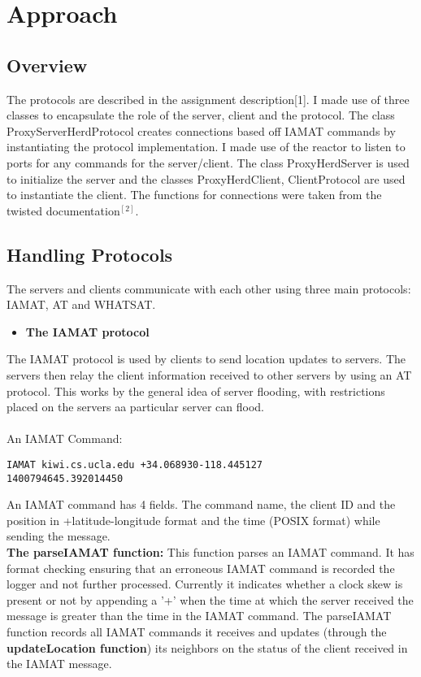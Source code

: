 \documentclass[letterpaper,twocolumn,10pt]{article}
\begin{document}
\section{Approach}
\label{ApproachSection}

\subsection{Overview} 
The protocols are described in the assignment description[1]. I made use of three classes to encapsulate the role of the server, client  and the protocol. The class ProxyServerHerdProtocol creates connections based off IAMAT commands by instantiating the protocol implementation. I made use of the reactor to listen to ports for any commands for the server/client. The class ProxyHerdServer is used to initialize the server and the classes ProxyHerdClient, ClientProtocol are used to instantiate the client. The functions for connections were taken from the twisted documentation$^{[2]}$.


\subsection{Handling Protocols} 
The servers and clients communicate with each other using three main protocols: IAMAT, AT and WHATSAT.

\begin{itemize}
\item \textbf{The IAMAT protocol}
\end{itemize}


The IAMAT protocol is used by clients to send location updates to servers. The servers then relay the client information received to other servers by using an AT protocol. This works by the general idea of server flooding, with restrictions placed on the servers aa particular server can flood.\\
\\ 
An IAMAT Command:
\begin{lstlisting}
IAMAT kiwi.cs.ucla.edu +34.068930-118.445127 
1400794645.392014450
\end{lstlisting}

An IAMAT command has 4 fields. The command name, the client ID and the position in +latitude-longitude format and the time (POSIX format) while sending the message. 
\\
\textbf{The parseIAMAT function:} This function parses an IAMAT command. It has format checking ensuring that an erroneous IAMAT command is recorded the logger and not further processed. 
Currently it indicates whether a clock skew is present or not by appending a '+' when the time at which the server received the message is greater than the time in the IAMAT command.
The parseIAMAT function records all IAMAT commands it receives and updates (through the \textbf{updateLocation function}) its neighbors on the status of the client received in the IAMAT message.
\end{document}
